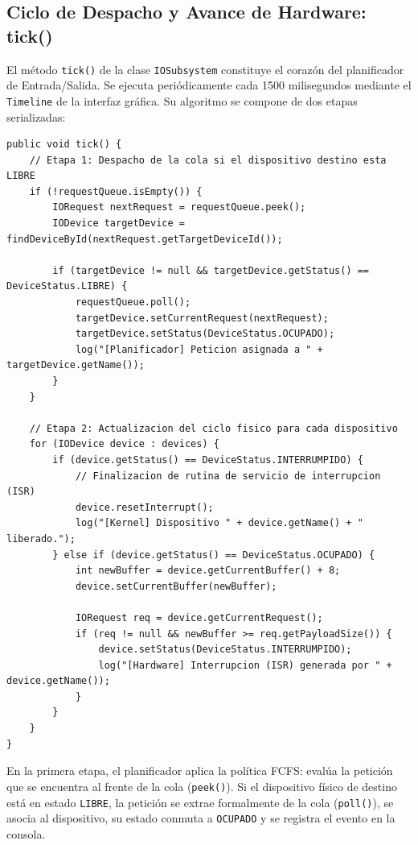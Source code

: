 \documentclass[11pt,letterpaper]{article}
\begin{document}
\subsection{Ciclo de Despacho y Avance de Hardware: tick()}
El método \texttt{tick()} de la clase \texttt{IOSubsystem} constituye el corazón del planificador de Entrada/Salida. Se ejecuta periódicamente cada 1500 milisegundos mediante el \texttt{Timeline} de la interfaz gráfica. Su algoritmo se compone de dos etapas serializadas:

\begin{lstlisting}[caption={Implementación del ciclo de reloj del núcleo en IOSubsystem.java}, label={lst:tick_code}]
public void tick() {
    // Etapa 1: Despacho de la cola si el dispositivo destino esta LIBRE
    if (!requestQueue.isEmpty()) {
        IORequest nextRequest = requestQueue.peek();
        IODevice targetDevice = findDeviceById(nextRequest.getTargetDeviceId());

        if (targetDevice != null && targetDevice.getStatus() == DeviceStatus.LIBRE) {
            requestQueue.poll();
            targetDevice.setCurrentRequest(nextRequest);
            targetDevice.setStatus(DeviceStatus.OCUPADO);
            log("[Planificador] Peticion asignada a " + targetDevice.getName());
        }
    }

    // Etapa 2: Actualizacion del ciclo fisico para cada dispositivo
    for (IODevice device : devices) {
        if (device.getStatus() == DeviceStatus.INTERRUMPIDO) {
            // Finalizacion de rutina de servicio de interrupcion (ISR)
            device.resetInterrupt();
            log("[Kernel] Dispositivo " + device.getName() + " liberado.");
        } else if (device.getStatus() == DeviceStatus.OCUPADO) {
            int newBuffer = device.getCurrentBuffer() + 8;
            device.setCurrentBuffer(newBuffer);

            IORequest req = device.getCurrentRequest();
            if (req != null && newBuffer >= req.getPayloadSize()) {
                device.setStatus(DeviceStatus.INTERRUMPIDO);
                log("[Hardware] Interrupcion (ISR) generada por " + device.getName());
            }
        }
    }
}
\end{lstlisting}

En la primera etapa, el planificador aplica la política FCFS: evalúa la petición que se encuentra al frente de la cola (\texttt{peek()}). Si el dispositivo físico de destino está en estado \texttt{LIBRE}, la petición se extrae formalmente de la cola (\texttt{poll()}), se asocia al dispositivo, su estado conmuta a \texttt{OCUPADO} y se registra el evento en la consola.
\end{document}
